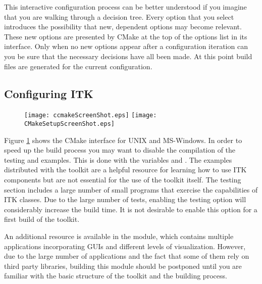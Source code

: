 This interactive configuration process can be better understood if you
imagine that you are walking through a decision tree.  Every option that you
select introduces the possibility that new, dependent options may become
relevant. These new options are presented by CMake at the top of the options
list in its interface.  Only when no new options appear after a configuration
iteration can you be sure that the necessary decisions have all been made. At
this point build files are generated for the current configuration.

\subsection{Configuring ITK}
\label{sec:ConfiguringITKwithVTK}
  

\begin{figure}[ht]
\centering 
\texttt{[image: ccmakeScreenShot.eps]}
\texttt{[image: CMakeSetupScreenShot.eps]}
\label{fig:CMakeGUI}
\end{figure}

Figure \ref{fig:CMakeGUI} shows the CMake interface for UNIX and MS-Windows.
In order to speed up the build process you may want to disable the compilation
of the testing and examples. This is done with the variables
 and .  The examples
distributed with the toolkit are a helpful resource for learning how to use ITK
components but are not essential for the use of the toolkit itself. The testing
section includes a large number of small programs that exercise the
capabilities of ITK classes. Due to the large number of tests, enabling the
testing option will considerably increase the build time.  It is not
desirable to enable this option for a first build of the toolkit.

An additional resource is available in the  module,
which contains multiple applications incorporating GUIs and different levels
of visualization.  However, due to the large number of applications and the
fact that some of them rely on third party libraries, building this module
should be postponed until you are familiar with the basic structure of the
toolkit and the building process. 

